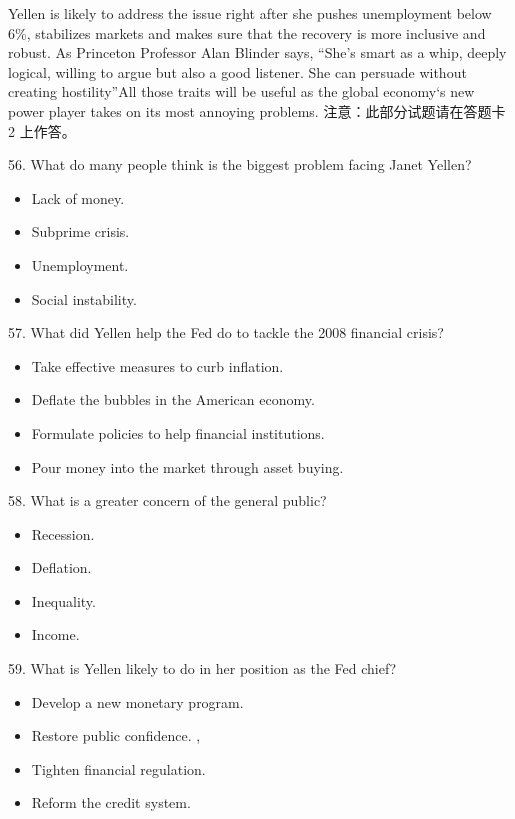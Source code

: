 \documentclass[UTF8,11pt]{ctexart}
\begin{document}
Yellen is likely to address the issue right after she pushes unemployment below 6\%, stabilizes markets and makes sure that the recovery is more inclusive and robust. As Princeton Professor Alan Blinder says, “She’s smart as a whip, deeply logical, willing to argue but also a good listener. She can persuade without creating hostility”All those traits will be useful as the global economy‘s new power player takes on its most annoying problems. 注意：此部分试题请在答题卡2 上作答。


56. What do many people think is the biggest problem facing Janet Yellen?


\begin{itemize}[leftmargin=2em,itemsep=.2em,topsep=.4em]\item[A.] Lack of money.
\item[B.] Subprime crisis.
\item[C.] Unemployment.
\item[D.] Social instability.
\end{itemize}

57. What did Yellen help the Fed do to tackle the 2008 financial crisis?


\begin{itemize}[leftmargin=2em,itemsep=.2em,topsep=.4em]\item[A.] Take effective measures to curb inflation.
\item[B.] Deflate the bubbles in the American economy.
\item[C.] Formulate policies to help financial institutions.
\item[D.] Pour money into the market through asset buying.
\end{itemize}

58. What is a greater concern of the general public?


\begin{itemize}[leftmargin=2em,itemsep=.2em,topsep=.4em]\item[A.] Recession.
\item[B.] Deflation.
\item[C.] Inequality.
\item[D.] Income.
\end{itemize}

59. What is Yellen likely to do in her position as the Fed chief?


\begin{itemize}[leftmargin=2em,itemsep=.2em,topsep=.4em]\item[A.] Develop a new monetary program.
\item[B.] Restore public confidence. ,
\item[C.] Tighten financial regulation.
\item[D.] Reform the credit system.
\end{itemize}
\end{document}
